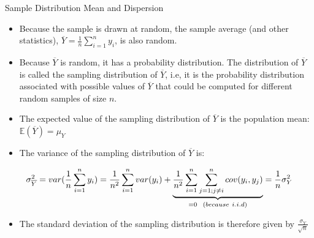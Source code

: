 \documentclass[notes,10pt, aspectratio=169]{beamer}
\begin{document}
\begin{frame}{Sample Distribution Mean and Dispersion}
    \begin{itemize}
        \item Because the sample is drawn at random, the sample average (and other statistics), $\overline{Y}=\frac{1}{n}\sum^n_{i=1} y_i$, is also random.\vspace{.2cm}
        \item Because $\overline{Y}$ is random, it has a probability distribution. The distribution of $\overline{Y}$ is called the sampling distribution of $\overline{Y}$, i.e, it is the probability distribution associated with possible values of $\overline{Y}$ that could be computed for different random samples of size $n$.\vspace{.2cm}
        \item The expected value of the sampling distribution of $\overline{Y}$ is the population mean: $\mathbb{E}(\overline{Y})=\mu_Y$\vspace{.2cm}
        \item The variance of the sampling distribution of $\overline{Y}$ is:
    \end{itemize}
    \begin{eqnarray*}
        \sigma^2_{\overline{Y}} = var(\frac{1}{n}\sum^n_{i=1} y_i) =\frac{1}{n^2}\sum^n_{i=1} var(y_i) + \underbrace{\frac{1}{n^2}\sum^n_{i=1} \sum^n_{j=1;j\neq i} cov(y_i, y_j)}_{=0 ~~\text(because~i.i.d)} =\frac{1}{n}\sigma^2_Y 
    \end{eqnarray*}

    \begin{itemize}
        \item The standard deviation of the sampling distribution is therefore given by $\frac{\sigma_Y}{\sqrt{n}}$
    \end{itemize}
\end{frame}
\end{document}
